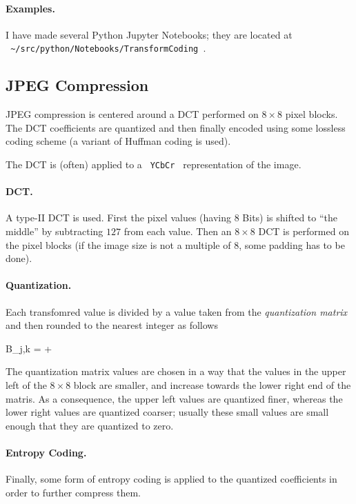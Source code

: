 \paragraph{Examples.} I have made several Python Jupyter Notebooks; they are located at \\ \verb+ ~/src/python/Notebooks/TransformCoding +. 

\subsection{JPEG Compression}

JPEG compression is centered around a DCT performed on $8 \times 8$ pixel blocks. The DCT coefficients are quantized and then finally encoded using some lossless coding scheme (a variant of Huffman coding is used). 

The DCT is (often) applied to a \verb+ YCbCr + representation of the image.

\paragraph{DCT.} A type-II DCT is used. First the pixel values (having $8$ Bits) is shifted to ``the middle'' by subtracting $127$ from each value. Then an $8 \times 8$ DCT is performed on the pixel blocks (if the image size is not a multiple of $8$, some padding has to be done).


\paragraph{Quantization.} Each transfomred value is divided by a value taken from the \emph{quantization matrix} and then rounded to the nearest integer as follows

\bee
B_{j,k} = \lfloor {} +  \rfloor
\eee

The quantization matrix values are chosen in a way that the values in the upper left of the $8 \times 8$ block are smaller, and increase towards the lower right end of the matris. As a consequence, the upper left values are quantized finer, whereas the lower right values are quantized coarser; usually these small values are small enough that they are quantized to zero.


\paragraph{Entropy Coding.} Finally, some form of entropy coding is applied to the quantized coefficients in order to further compress them.



